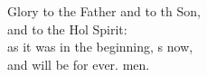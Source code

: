 \begin{psalmverse}
\begin{patverse}
Glory to the Father and to th Son,\Med\\
    and to the Hol Spirit:\\
as it was in the beginning, \pointup{\i}s now,\Med\\
    and will be for ever. men.
  \end{patverse}
  \end{psalmverse}
